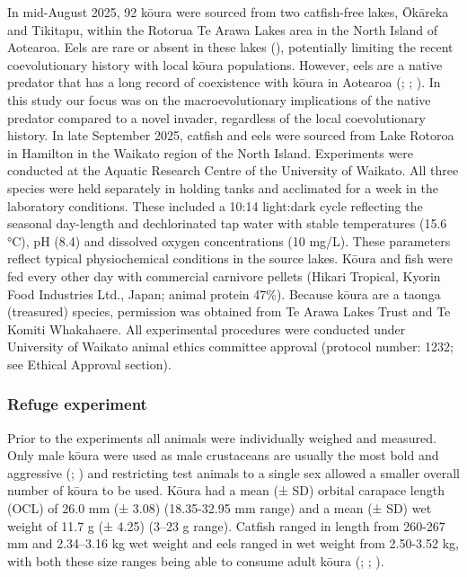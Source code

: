 \documentclass[
  letterpaper,
  DIV=11,
  numbers=noendperiod]{scrartcl}
\begin{document}
In mid-August 2025, 92 kōura were sourced from two catfish-free lakes,
Ōkāreka and Tikitapu, within the Rotorua Te Arawa Lakes area in the
North Island of Aotearoa. Eels are rare or absent in these lakes
(), potentially limiting
the recent coevolutionary history with local kōura populations. However,
eels are a native predator that has a long record of coexistence with
kōura in Aotearoa (;
;
). In this study our
focus was on the macroevolutionary implications of the native predator
compared to a novel invader, regardless of the local coevolutionary
history. In late September 2025, catfish and eels were sourced from Lake
Rotoroa in Hamilton in the Waikato region of the North Island.
Experiments were conducted at the Aquatic Research Centre of the
University of Waikato. All three species were held separately in holding
tanks and acclimated for a week in the laboratory conditions. These
included a 10:14 light:dark cycle reflecting the seasonal day-length and
dechlorinated tap water with stable temperatures (15.6 °C), pH (8.4) and
dissolved oxygen concentrations (10 mg/L). These parameters reflect
typical physiochemical conditions in the source lakes. Kōura and fish
were fed every other day with commercial carnivore pellets (Hikari
Tropical, Kyorin Food Industries Ltd., Japan; animal protein 47\%).
Because kōura are a taonga (treasured) species, permission was obtained
from Te Arawa Lakes Trust and Te Komiti Whakahaere. All experimental
procedures were conducted under University of Waikato animal ethics
committee approval (protocol number: 1232; see Ethical Approval
section).

\subsubsection{Refuge experiment}\label{refuge-experiment}

Prior to the experiments all animals were individually weighed and
measured. Only male kōura were used as male crustaceans are usually the
most bold and aggressive (; ) and restricting
test animals to a single sex allowed a smaller overall number of kōura
to be used. Kōura had a mean (± SD) orbital carapace length (OCL) of
26.0 mm (± 3.08) (18.35-32.95 mm range) and a mean (± SD) wet weight of
11.7 g (± 4.25) (3--23 g range). Catfish ranged in length from 260-267
mm and 2.34--3.16 kg wet weight and eels ranged in wet weight from
2.50-3.52 kg, with both these size ranges being able to consume adult
kōura (;
;
).
\end{document}
